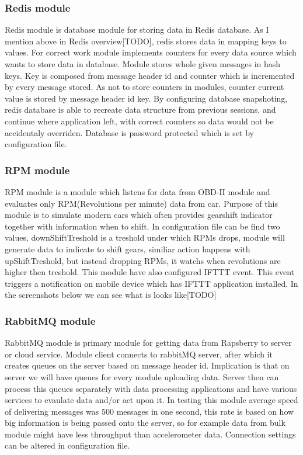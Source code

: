 \subsubsection{Redis module} %
\label{ssub:redis_module}
Redis module is database module for storing data in Redis database. As I mention above in Redis overview[TODO], redis stores data in mapping keys to values. For correct work module implements counters for every data source which wants to store data in database.  Module stores whole given messages in hash keys. Key is composed from message header id and counter which is incremented by every message stored. As not to store counters in modules, counter current value is stored by message header id key. By configuring database snapshoting, redis database is able to recreate data structure from previous sessions, and continue where application left, with correct counters so data would not be accidentaly overriden. Database is password protected which is set by configuration file.
\subsubsection{RPM module} %
\label{ssub:rpm_module}
RPM module is a module which listens for data from OBD-II module and evaluates only RPM(Revolutions per minute) data from car. Purpose of this module is to simulate modern cars which often provides gearshift indicator together with information when to shift. In configuration file can be find two values, downShiftTreshold is a treshold under which RPMs drops, module will generate data to indicate to shift gears, similiar action happens with upShiftTreshold, but instead dropping RPMs, it watchs when revolutions are higher then treshold. This module have also configured IFTTT event. This event triggers a notification on mobile device which has IFTTT application installed. In the screenshots below we can see what is looks like[TODO]
\subsubsection{RabbitMQ module} %
\label{ssub:rabbitmq_module}
RabbitMQ module is primary module for getting data from Rapsberry to server or cloud service. Module client connects to rabbitMQ server, after which it creates queues on the server based on message header id. Implication is that on server we will have queues for every module uploading data. Server then can process this queues separately with data processing applications and have various services to evaulate data and/or act upon it. In testing this module average speed of delivering messages was 500 messages in one second, this rate is based on how big information is being passed onto the server, so for example data from bulk module might have less throughput than accelerometer data. Connection settings can be altered in configuration file.
